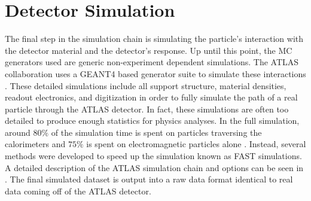 	\section{Detector Simulation}\label{sec:detector-sim}
		The final step in the simulation chain is simulating the particle's interaction with the detector material and the detector's response. Up until this point, the \gls{MC} generators used are generic non-experiment dependent simulations. The \gls{ATLAS} collaboration uses a GEANT4 based generator suite to simulate these interactions \cite{GEANT4}. These detailed simulations include all support structure, material densities, readout electronics, and digitization in order to fully simulate the path of a real particle through the \gls{ATLAS} detector. In fact, these simulations are often too detailed to produce enough statistics for physics analyses. In the full simulation, around $80\%$ of the simulation time is spent on particles traversing the calorimeters and $75\%$ is spent on electromagnetic particles alone \cite{ATLAS-simulation}. Instead, several methods were developed to speed up the simulation known as FAST simulations. A detailed description of the \gls{ATLAS} simulation chain and options can be seen in \cite{ATLAS-simulation}. The final simulated dataset is output into a raw data format identical to real data coming off of the \gls{ATLAS} detector. 

		